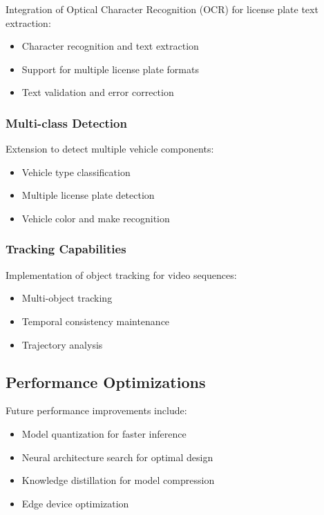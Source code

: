 \documentclass[12pt,a4paper]{article}
\begin{document}
Integration of Optical Character Recognition (OCR) for license plate text extraction:

\begin{itemize}
    \item Character recognition and text extraction
    \item Support for multiple license plate formats
    \item Text validation and error correction
\end{itemize}

\subsubsection{Multi-class Detection}

Extension to detect multiple vehicle components:

\begin{itemize}
    \item Vehicle type classification
    \item Multiple license plate detection
    \item Vehicle color and make recognition
\end{itemize}

\subsubsection{Tracking Capabilities}

Implementation of object tracking for video sequences:

\begin{itemize}
    \item Multi-object tracking
    \item Temporal consistency maintenance
    \item Trajectory analysis
\end{itemize}

\subsection{Performance Optimizations}

Future performance improvements include:

\begin{itemize}
    \item Model quantization for faster inference
    \item Neural architecture search for optimal design
    \item Knowledge distillation for model compression
    \item Edge device optimization
\end{itemize}
\end{document}
